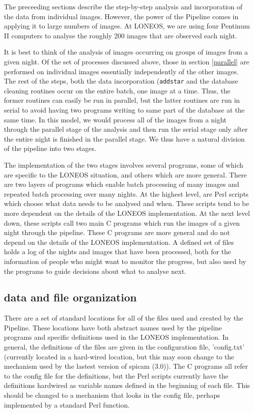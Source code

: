 \documentclass{article}
\begin{document}
The preceeding sections describe the step-by-step analysis and
incorporation of the data from individual images.  However, the power
of the Pipeline comes in applying it to large numbers of images.  At
LONEOS, we are using four Pentinum II computers to analyse the roughly 200
images that are observed each night.  

It is best to think of the analysis of images occurring on groups of
images from a given night.  Of the set of processes discussed above,
those in section \ref{parallel} are performed on individual images
essentially independently of the other images.  The rest of the steps,
both the data incorporation ({\tt addstar} and the database cleaning
routines occur on the entire batch, one image at a time.  Thus, the
former routines can easily be run in parallel, but the latter routines
are run in serial to avoid having two programs writing to same part of
the database at the same time.  In this model, we would process all of
the images from a night through the parallel stage of the analysis and
then run the serial stage only after the entire night is finished in
the parallel stage.  We thus have a natural division of the pipeline
into two stages.  

The implementation of the two stages involves several programs, some
of which are specific to the LONEOS situation, and others which are
more general.  There are two layers of programs which enable batch
processing of many images and repeated batch processing over many
nights.  At the highest level, are Perl scripts which choose what data
needs to be analysed and when.  These scripts tend to be more
dependent on the details of the LONEOS implementation. At the next
level down, these scripts call two main C programs which run the
images of a given night through the pipeline.  These C programs are
more general and do not depend on the details of the LONEOS
implementation.  A defined set of files holds a log of the nights and
images that have been processed, both for the information of people
who might want to monitor the progress, but also used by the programs
to guide decisions about what to analyse next.

\subsection{data and file organization}

There are a set of standard locations for all of the files used and
created by the Pipeline.  These locations have both abstract names
used by the pipeline programs and specific definitions used in the
LONEOS implementation.  In general, the definitions of the files are
given in the configuration file, 'config.txt' (currently located in a
hard-wired location, but this may soon change to the mechanism used by
the lastest version of spicam (3.0)).  The C programs all refer to the
config file for the definitions, but the Perl scripts currently have
the definitions hardwired as variable names defined in the beginning
of each file.  This should be changed to a mechanism that looks in
the config file, perhaps implemented by a standard Perl function.
\end{document}
